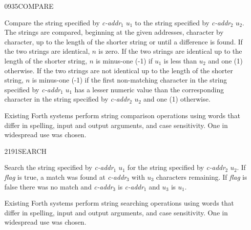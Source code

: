 \begin{newword}{0935}{COMPARE}

	Compare the string specified by \emph{c-addr}$_1$ $u_1$ to the
	string specified by \emph{c-addr}$_2$ $u_2$. The strings are
	compared, beginning at the given addresses, character by
	character, up to the length of the shorter string or until a
	difference is found. If the two strings are identical, $n$ is
	zero. If the two strings are identical up to the length of the
	shorter string, $n$ is minus-one (-1) if $u_1$ is less than $u_2$
	and one (1) otherwise. If the two strings are not identical up to
	the length of the shorter string, $n$ is minus-one (-1) if the
	first non-matching character in the string specified by
	\emph{c-addr}$_1$ $u_1$ has a lesser numeric value than the
	corresponding character in the string specified by
	\emph{c-addr}$_2$ $u_2$ and one (1) otherwise.

	\begin{rationale}
		Existing Forth systems perform string comparison operations
		using words that differ in spelling, input and output
		arguments, and case sensitivity. One in widespread use
		was chosen.
	\end{rationale}
\end{newword}


\begin{newword}{2191}{SEARCH}

	Search the string specified by \emph{c-addr}$_1$ $u_1$ for the
	string specified by \emph{c-addr}$_2$ $u_2$. If \emph{flag} is
	true, a match was found at \emph{c-addr}$_3$ with $u_3$
	characters remaining. If \emph{flag} is false there was no match
	and \emph{c-addr}$_3$ is \emph{c-addr}$_1$ and $u_3$ is $u_1$.

	\begin{rationale}
		Existing Forth systems perform string searching operations
		using words that differ in spelling, input and output
		arguments, and case sensitivity. One in widespread use was
		chosen.
	\end{rationale}
\end{newword}


